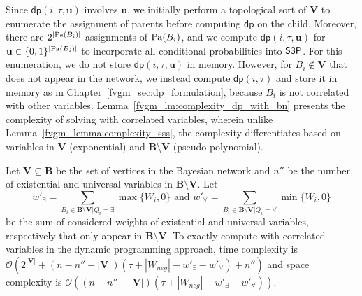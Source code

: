 Since $ \mathsf{dp}(i, \tau, \mathbf{u}) $ involves  $ \mathbf{u} $, we initially perform a topological sort of $ \mathbf{V} $ to enumerate the assignment of parents before computing $ \mathsf{dp} $ on the child. Moreover, there are $ 2^{|\mathrm{Pa}(B_i)|} $ assignments of $ \mathrm{Pa}(B_i) $, and we compute $ \mathsf{dp}(i, \tau, \mathbf{u}) $ for $ \mathbf{u} \in \{0,1\}^{|\mathrm{Pa}(B_i)|} $ to incorporate all conditional probabilities into $ \mathsf{S3P} $.  For this enumeration, we do not store $ \mathsf{dp}(i, \tau, \mathbf{u}) $ in memory. However, for $ B_i \not \in \mathbf{V} $ that does not appear in the network, we instead compute $ \mathsf{dp}(i, \tau) $ and store it in memory as in Chapter~\ref{fvgm_sec:dp_formulation}, because $ B_i $ is not correlated with other variables.  Lemma~\ref{fvgm_lm:complexity_dp_with_bn} presents the complexity of solving {\stochastic} with correlated variables, wherein unlike Lemma~\ref{fvgm_lemma:complexity_sss}, the  complexity differentiates based on variables in $ \mathbf{V} $ (exponential) and $ \mathbf{B}\setminus \mathbf{V} $ (pseudo-polynomial). 


\begin{lemma}
	\label{fvgm_lm:complexity_dp_with_bn}
	Let $ \mathbf{V} \subseteq \mathbf{B} $ be the set of vertices in the Bayesian network and $ n'' $ be the number of existential and universal variables in $ \mathbf{B} \setminus \mathbf{V} $. Let $$ w'_{\exists} = \sum_{B_i \in \mathbf{B} \setminus \mathbf{V} | Q_i = \exists} \max\{W_i, 0\} \text{ and } w'_{\forall} = \sum_{B_i \in \mathbf{B} \setminus \mathbf{V} | Q_i = \forall} \min\{W_i, 0\}$$ be the sum of considered weights of existential and universal variables, respectively that only appear in $ \mathbf{B} \setminus \mathbf{V} $. To exactly compute {\stochastic} with correlated variables in the dynamic programming approach,  time complexity is $ \mathcal{O}(2^{|\mathbf{V}|} + (n - n'' - |\mathbf{V}|)(\tau + |W_{neg}| - w'_{\exists} - w'_{\forall}) + n'') $ and space complexity is $ \mathcal{O}((n - n'' - |\mathbf{V}|)(\tau + |W_{neg}| - w'_{\exists} - w'_{\forall})) $.
\end{lemma}	



